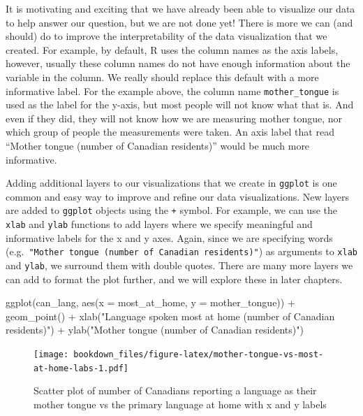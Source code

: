 \documentclass[
]{krantz}
\makeatletter
\newenvironment{Shaded}{\begin{snugshade}}{\end{snugshade}}
\newcommand{\AttributeTok}[1]{\textcolor[rgb]{0.61,0.61,0.61}{#1}}
\newcommand{\FunctionTok}[1]{\textcolor[rgb]{0,0,0}{#1}}
\newcommand{\NormalTok}[1]{#1}
\newcommand{\SpecialCharTok}[1]{\textcolor[rgb]{0,0,0}{#1}}
\newcommand{\StringTok}[1]{\textcolor[rgb]{0.5,0.5,0.5}{#1}}
\newenvironment{kframe}{%
\medskip{}
\setlength{\fboxsep}{.8em}
 \def\at@end@of@kframe{}%
 \ifinner\ifhmode%
  \def\at@end@of@kframe{\end{minipage}}%
  \begin{minipage}{\columnwidth}%
 \fi\fi%
 \def\FrameCommand##1{\hskip\@totalleftmargin \hskip-\fboxsep
 \colorbox{shadecolor}{##1}\hskip-\fboxsep
     \hskip-\linewidth \hskip-\@totalleftmargin \hskip\columnwidth}%
 \MakeFramed {\advance\hsize-\width
   \@totalleftmargin\z@ \linewidth\hsize
   \@setminipage}}%
 {\par\unskip\endMakeFramed%
 \at@end@of@kframe}
\renewenvironment{Shaded}{\begin{kframe}}{\end{kframe}}
\makeatother
\begin{document}
It is motivating and exciting that we have already been able to visualize our
data to help answer our question, but we are not done yet! There is more we can
(and should) do to improve the interpretability of the data visualization that
we created. For example, by default, R uses the column names as the axis labels,
however, usually these column names do not have enough information about
the variable in the column. We really should replace this default with a more
informative label. For the example above, the column name \texttt{mother\_tongue} is
used as the label for the y-axis, but most people will not know what that is.
And even if they did, they will not know how we are measuring mother tongue, nor
which group of people the measurements were taken. An axis label that
read ``Mother tongue (number of Canadian residents)'' would be much more
informative.

Adding additional layers to our visualizations that we create in \texttt{ggplot} is one
common and easy way to improve and refine our data visualizations. New layers
are added to \texttt{ggplot} objects using the \texttt{+} symbol. For example, we can use the
\texttt{xlab} and \texttt{ylab} functions to add layers where we specify meaningful and
informative labels for the x and y axes. Again, since we are specifying words
(e.g.~\texttt{"Mother\ tongue\ (number\ of\ Canadian\ residents)"}) as arguments to \texttt{xlab}
and \texttt{ylab}, we surround them with double quotes. There are many more layers we
can add to format the plot further, and we will explore these in later chapters.

\begin{Shaded}
\begin{Highlighting}[]
\FunctionTok{ggplot}\NormalTok{(can\_lang, }\FunctionTok{aes}\NormalTok{(}\AttributeTok{x =}\NormalTok{ most\_at\_home, }\AttributeTok{y =}\NormalTok{ mother\_tongue)) }\SpecialCharTok{+}
  \FunctionTok{geom\_point}\NormalTok{() }\SpecialCharTok{+}
  \FunctionTok{xlab}\NormalTok{(}\StringTok{"Language spoken most at home (number of Canadian residents)"}\NormalTok{) }\SpecialCharTok{+}
  \FunctionTok{ylab}\NormalTok{(}\StringTok{"Mother tongue (number of Canadian residents)"}\NormalTok{)}
\end{Highlighting}
\end{Shaded}

\begin{figure}
\centering
\texttt{[image: bookdown\_files/figure-latex/mother-tongue-vs-most-at-home-labs-1.pdf]}
\caption{\label{fig:mother-tongue-vs-most-at-home-labs}Scatter plot of number of Canadians reporting a language as their mother tongue vs the primary language at home with x and y labels}
\end{figure}
\end{document}
